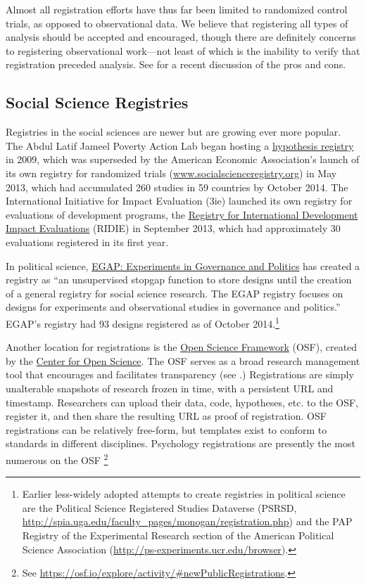 \documentclass[12pt] {article}
\begin{document}
Almost all registration efforts have thus far been limited to randomized
control trials, as opposed to observational data. We believe
that registering all types of analysis should be accepted and encouraged, though there are definitely concerns to registering observational work---not least of which is the inability to verify that registration preceded analysis. See \cite{dal-re_making_2014} for a recent discussion of the pros and cons.
 
\subsection{Social Science Registries}\label{social-science-registries}

Registries in the social sciences are newer but are growing ever more
popular. The Abdul Latif Jameel Poverty Action Lab began hosting a
\href{http://www.povertyactionlab.org/hypothesis-registry}{hypothesis registry}
 in 2009, which was superseded by the American Economic Association's launch of
its own registry for randomized trials
(\href{http://www.socialscienceregistry.org}{www.socialscienceregistry.org})
in May 2013, which had accumulated 260 studies in 59 countries by
October 2014. The International Initiative for Impact Evaluation (3ie)
launched its own registry for evaluations of development programs, the
\href{http://ridie.3ieimpact.org}{Registry for International Development Impact Evaluations} (RIDIE) in September 2013, which had
approximately 30 evaluations registered in its first year.

In political science, \href{http://e-gap.org/design-registration}{EGAP: Experiments in Governance and Politics} has
created a registry as ``an unsupervised stopgap function to store
designs until the creation of a general registry for social science
research. The EGAP registry focuses on designs for experiments and
observational studies in governance and politics.'' EGAP's registry had 93
designs registered as of October 2014.\footnote{Earlier less-widely
  adopted attempts to create registries in political science are the
  Political Science Registered Studies Dataverse (PSRSD,
  \href{../customXml/item1.xml}{http://spia.uga.edu/faculty\_pages/monogan/registration.php})
  and the PAP Registry of the Experimental Research section of the
  American Political Science Association
  (\href{numbering.xml}{http://ps-experiments.ucr.edu/browser}).}

Another location for registrations is the \href{http://osf.io}{Open Science Framework} (OSF), created by the \href{http://centerforopenscience.org/}{Center for Open Science}. The OSF serves as a broad research management tool that encourages and facilitates transparency (see \cite{nosek_scientific_2012}.) Registrations are simply unalterable snapshots of research frozen in time, with a persistent URL and timestamp. Researchers can upload their data, code, hypotheses, etc. to the OSF, register it, and then share the resulting URL as proof of registration. OSF registrations can be relatively free-form, but templates exist to conform to standards in different disciplines. Psychology registrations are presently the most numerous on the OSF \footnote{See \url{https://osf.io/explore/activity/\#newPublicRegistrations}.}
\end{document}
